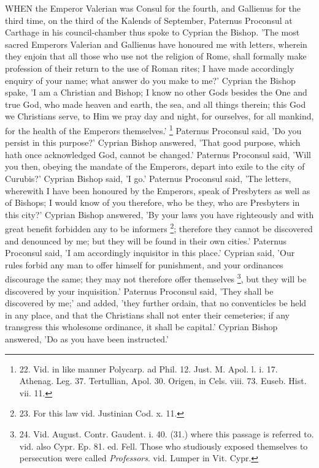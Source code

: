 WHEN the Emperor
Valerian was Consul for the fourth, and Gallienus for the third time,
on the third of the Kalends of September, Paternus Proconsul at
Carthage in his council-chamber thus spoke to Cyprian the Bishop. 'The
most sacred Emperors Valerian and Gallienus have honoured me with
letters, wherein they enjoin that all those who use not the religion
of Rome, shall formally make profession of their return to the use of
Roman rites; I have made accordingly enquiry of your name; what answer
do you make to me?' Cyprian the Bishop spake, 'I am a Christian
and Bishop; I know no other Gods besides the One and true God, who
made heaven and earth, the sea, and all things therein; this God we
Christians serve, to Him we pray day and night, for ourselves, for all
mankind, for the health of the Emperors themselves.' \footnote{22. Vid.
in like manner Polycarp. ad Phil. 12. Just. M. Apol. l. i. 17. Athenag.
Leg. 37. Tertullian, Apol. 30. Origen, in Cels. viii. 73. Euseb. Hist.
vii. 11.} Paternus Proconsul said, 'Do you persist in this purpose?'
Cyprian Bishop answered, 'That good purpose, which hath once
acknowledged God, cannot be changed.' Paternus Proconsul said, 'Will
you then, obeying the mandate of the Emperors, depart into exile to
the city of Curubis?' Cyprian Bishop said, 'I go.' Paternus Proconsul
said, 'The letters, wherewith I have been honoured by the Emperors,
speak of Presbyters as well as of Bishops; I would know of you
therefore, who be they, who are Presbyters in this city?' Cyprian
Bishop answered, 'By your laws you have righteously and with great
benefit forbidden any to be informers \footnote{23. For
this law vid. Justinian Cod. x. 11.}; therefore they cannot be discovered and denounced by me; but
they will be found in their own cities.' Paternus Proconsul said, 'I
am accordingly inquisitor in this place.' Cyprian said, 'Our rules
forbid any man to offer himself for punishment, and your ordinances
discourage the same; they may not therefore offer themselves \footnote{24. Vid.
August. Contr. Gaudent. i. 40. (31.) where this passage is referred
to. vid. also Cypr. Ep. 81. ed. Fell. Those who studiously exposed
themselves to persecution were called \emph{Professors}. vid. Lumper
in Vit. Cypr.}, but they will be discovered by your inquisition.' Paternus
Proconsul said, 'They shall be discovered by me;' and added, 'they
further ordain, that no conventicles be held in any place, and that
the Christians shall not enter their cemeteries; if any transgress
this wholesome ordinance, it shall be capital.' Cyprian Bishop
answered, 'Do as you have been instructed.'

